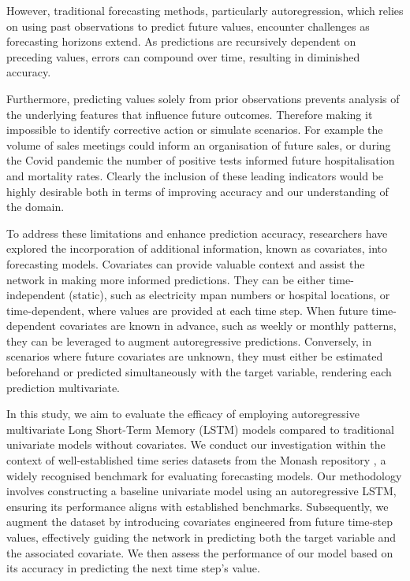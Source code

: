 \documentclass{article}
\begin{document}
However, traditional forecasting methods, particularly autoregression, which relies on using past observations to 
predict future values, encounter challenges as forecasting horizons extend. As predictions are recursively 
dependent on preceding values, errors can compound over time, resulting in diminished accuracy.

Furthermore, predicting values solely from prior observations prevents analysis of the underlying features that influence future 
outcomes. Therefore making it impossible to identify corrective action or simulate scenarios. For example the volume of sales 
meetings could inform an organisation of future sales, or during the Covid pandemic the number of positive tests informed 
future hospitalisation and mortality rates.  Clearly the inclusion of
these leading indicators would be highly desirable both in terms of improving accuracy and our understanding of the domain.

To address these limitations and enhance prediction accuracy, researchers have explored the incorporation of 
additional information, known as covariates, into forecasting models. Covariates can provide valuable context 
and assist the network in making more informed predictions. They can be either time-independent (static), such as 
electricity mpan numbers or hospital locations, or time-dependent, where values are provided at each time step. 
When future time-dependent covariates are known in advance, such as weekly or monthly patterns, they can be 
leveraged to augment autoregressive predictions. Conversely, in scenarios where future covariates are unknown, 
they must either be estimated beforehand or predicted simultaneously with the target variable, rendering each 
prediction multivariate.

In this study, we aim to evaluate the efficacy of employing autoregressive multivariate Long Short-Term Memory 
(LSTM) models compared to traditional univariate models without covariates. We conduct our investigation 
within the context of well-established time series datasets from the Monash repository \cite{DBLP:conf/nips/GodahewaBWHM21}, 
a widely recognised benchmark for evaluating forecasting models. Our methodology involves constructing a baseline univariate model 
using an autoregressive LSTM, ensuring its performance aligns with established benchmarks. Subsequently, we 
augment the dataset by introducing covariates engineered from future time-step values, effectively guiding 
the network in predicting both the target variable and the associated covariate. We then assess the performance 
of our model based on its accuracy in predicting the next time step's value.
\end{document}
